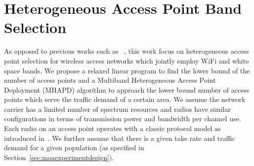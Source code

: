 



\section{Heterogeneous Access Point Band Selection}
\label{subsec:moaproblem}

As opposed to previous works such as ~\cite{franklin2007node,robinson2010deploying,si2010overview}, 
this work focus on heterogeneous access point selection for wireless access networks which jointly employ WiFi 
and white space bands. We propose a relaxed linear program to find the lower bound of the number of access points
and a Multiband Heterogeneous Access Point Deployment (MHAPD) algorithm  to approach the lower bound 
number of access points which serve the traffic demand of a certain area. We assume the network carrier has a limited number 
of spectrum resources and radios have similar configurations in terms of transmission power and bandwidth per channel use. 
Each radio on an access point operates with a classic protocol model as introduced in~\cite{gupta2000capacity}. 
We further assume that there is a given take rate and traffic demand for a given population 
(as specified in Section~\ref{sec:moaexperimentdesign}).

